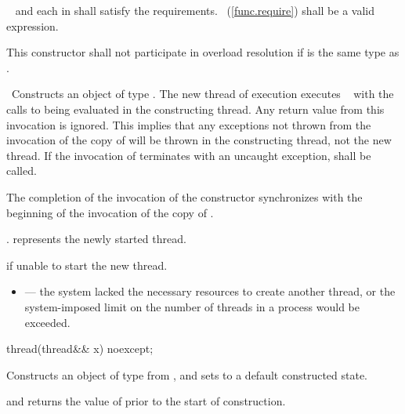 \begin{itemdescr}
\pnum
\requires\  and each  in  shall satisfy the
 requirements.
~(\ref{func.require}) shall be
a valid expression.

\pnum
\remarks
This constructor shall not participate in overload resolution if 
is the same type as .

\pnum
\effects\ Constructs an object of type . The new thread of execution executes
\
 with the calls to
\brk{}\tcode{\textit{DECAY_COPY}} being evaluated in the constructing thread. Any return value from this invocation
is ignored. \enternote This implies that any exceptions not thrown from the invocation of the copy
of \tcode{f} will be thrown in the constructing thread, not the new thread. \exitnote If the
invocation of
terminates with an uncaught exception, \tcode{std::terminate} shall be called.


\pnum\sync The completion of the invocation of the constructor
synchronizes with the beginning of the invocation of the copy of .

\pnum\postconditions {}.  represents the newly started thread.

\pnum\throws {} if unable to start the new thread.

\pnum\errors
\begin{itemize}
\item {} --- the system lacked the necessary
resources to create another thread, or the system-imposed limit on the number of
threads in a process would be exceeded.
\end{itemize}
\end{itemdescr}

%
\begin{itemdecl}
thread(thread&& x) noexcept;
\end{itemdecl}

\begin{itemdescr}
\pnum
\effects Constructs an object of type  from , and sets
\tcode{x} to a default constructed state.

\pnum
\postconditions {} and  returns the
value of \tcode{x.get_id()} prior to the start of construction.

\end{itemdescr}

